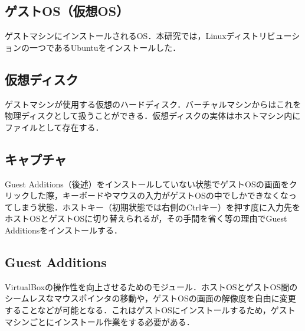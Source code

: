 \subsection{ゲストOS（仮想OS）}
ゲストマシンにインストールされるOS．本研究では，Linuxディストリビューションの一つであるUbuntuをインストールした．

\subsection{仮想ディスク}
ゲストマシンが使用する仮想のハードディスク．バーチャルマシンからはこれを物理ディスクとして扱うことができる．仮想ディスクの実体はホストマシン内にファイルとして存在する．

\subsection{キャプチャ}
Guest Additions（後述）をインストールしていない状態でゲストOSの画面をクリックした際，キーボードやマウスの入力がゲストOSの中でしかできなくなってしまう状態．ホストキー（初期状態では右側のCtrlキー）を押す度に入力先をホストOSとゲストOSに切り替えられるが，その手間を省く等の理由でGuest Additionsをインストールする．

\subsection{Guest Additions}
VirtualBoxの操作性を向上させるためのモジュール．ホストOSとゲストOS間のシームレスなマウスポインタの移動や，ゲストOSの画面の解像度を自由に変更することなどが可能となる\cite{LinuxMania}．これはゲストOSにインストールするため，ゲストマシンごとにインストール作業をする必要がある．

